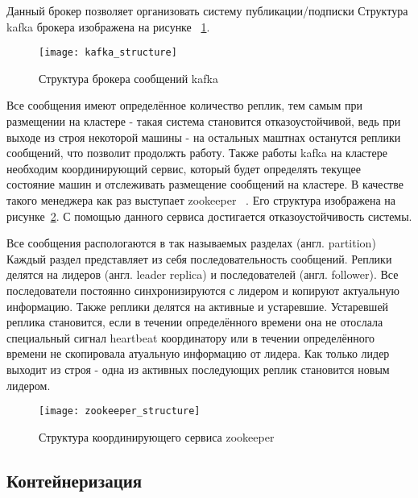 Данный брокер позволяет организовать систему публикации/подписки
Структура kafka брокера изображена на рисунке ~\ref{pic:lit_review:kafka_structure}.

\begin{figure}
    \centering
    \texttt{[image: kafka\_structure]}
    \caption{Структура брокера сообщений kafka}
    \label{pic:lit_review:kafka_structure}
\end{figure}

Все сообщения имеют определённое количество реплик, тем самым при размещении на кластере - такая система становится отказоустойчивой, ведь при выходе из строя некоторой машины - на остальных маштнах останутся реплики сообщений, что позволит продолжть работу.
Также работы kafka на кластере необходим координирующий сервис, который будет определять текущее состояние машин и отслеживать размещение сообщений на кластере.
В качестве такого менеджера как раз выступает zookeeper ~\cite{zookeeper_documentation_intro}.
Его структура изображена на рисунке~\ref{pic:lit_review:zookeeper_structure}.                   
С помощью данного сервиса достигается отказоустойчивость системы.

Все сообщения распологаются в так называемых разделах (англ. partition)
Каждый раздел представляет из себя последовательность сообщений.
Реплики делятся на лидеров (англ. leader replica) и последователей (англ. follower).
Все последователи постоянно синхронизируются с лидером и копируют актуальную информацию.
Также реплики делятся на активные и устаревшие.
Устаревшей реплика становится, если в течении определённого времени она не отослала специальный сигнал heartbeat координатору или в течении определённого времени не скопировала атуальную информацию от лидера.
Как только лидер выходит из строя - одна из активных последующих реплик становится новым лидером.

\begin{figure}
    \centering
    \texttt{[image: zookeeper\_structure]}
    \caption{Структура координирующего сервиса zookeeper}
    \label{pic:lit_review:zookeeper_structure}
\end{figure}

\subsection{Контейнеризация}

